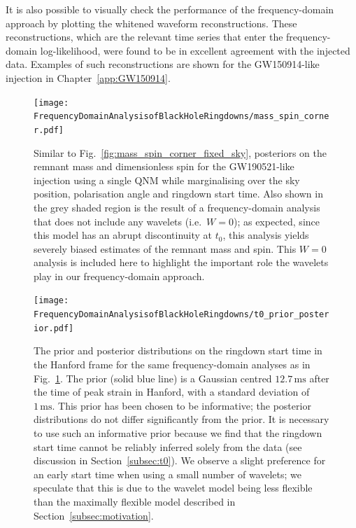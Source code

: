 It is also possible to visually check the performance of the frequency-domain approach by plotting the whitened waveform reconstructions.
These reconstructions, which are the relevant time series that enter the frequency-domain log-likelihood, were found to be in excellent agreement with the injected data. 
Examples of such reconstructions are shown for the GW150914-like injection in Chapter~\ref{app:GW150914}.

\begin{figure}[t!]
    \centering
    \texttt{[image: FrequencyDomainAnalysisofBlackHoleRingdowns/mass\_spin\_corner.pdf]}
    \caption[Posteriors on the remnant mass and spin for a GW190521-like injection analysed while marginalising over the sky location and ringdown start time, for different numbers of wavelets]{ 
    Similar to Fig.~\ref{fig:mass_spin_corner_fixed_sky}, posteriors on the remnant mass and dimensionless spin for the GW190521-like injection using a single QNM while marginalising over the sky position, polarisation angle and ringdown start time.
    Also shown in the grey shaded region is the result of a frequency-domain analysis that does not include any wavelets (i.e.\ $W=0$); as expected, since this model has an abrupt discontinuity at $t_0$, this analysis yields severely biased estimates of the remnant mass and spin. 
    This $W=0$ analysis is included here to highlight the important role the wavelets play in our frequency-domain approach.
    }
    \label{fig:mass_spin_corner_zero_spin}
\end{figure}

\begin{figure}[t!]
    \centering
    \texttt{[image: FrequencyDomainAnalysisofBlackHoleRingdowns/t0\_prior\_posterior.pdf]}
    \caption[Posteriors on the ringdown start time for the same analyses as in Fig.~\ref{fig:mass_spin_corner_zero_spin}]{ 
    The prior and posterior distributions on the ringdown start time in the Hanford frame for the same frequency-domain analyses as in Fig.~\ref{fig:mass_spin_corner_zero_spin}. 
    The prior (solid blue line) is a Gaussian centred $12.7\,\mathrm{ms}$ after the time of peak strain in Hanford, with a standard deviation of $1\,\mathrm{ms}$. 
    This prior has been chosen to be informative; the posterior distributions do not differ significantly from the prior.
    It is necessary to use such an informative prior because we find that the ringdown start time cannot be reliably inferred solely from the data (see discussion in Section~\ref{subsec:t0}).
    We observe a slight preference for an early start time when using a small number of wavelets; we speculate that this is due to the wavelet model being less flexible than the maximally flexible model described in Section~\ref{subsec:motivation}.
    }
    \label{fig:t0_prior_posterior}
\end{figure}

